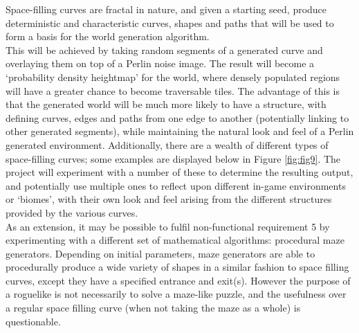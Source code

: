 \documentclass[12pt,a4paper]{article}
\begin{document}
Space-filling curves are fractal in nature, and given a starting seed, produce deterministic and characteristic curves, shapes and paths that will be used to form a basis for the world generation algorithm.\\

This will be achieved by taking random segments of a generated curve and overlaying them on top of a Perlin noise image. The result will become a `probability density heightmap' for the world, where densely populated regions will have a greater chance to become traversable tiles. The advantage of this is that the generated world will be much more likely to have a structure, with defining curves, edges and paths from one edge to another (potentially linking to other generated segments), while maintaining the natural look and feel of a Perlin generated environment. Additionally, there are a wealth of different types of space-filling curves; some examples are displayed below in Figure \ref{fig:fig9}. The project will experiment with a number of these to determine the resulting output, and potentially use multiple ones to reflect upon different in-game environments or `biomes', with their own look and feel arising from the different structures provided by the various curves. \\

As an extension, it may be possible to fulfil non-functional requirement 5 by experimenting with a different set of mathematical algorithms: procedural maze generators. Depending on initial parameters, maze generators are able to procedurally produce a wide variety of shapes in a similar fashion to space filling curves, except they have a specified entrance and exit(s). However the purpose of a roguelike is not necessarily to solve a maze-like puzzle, and the usefulness over a regular space filling curve (when not taking the maze as a whole) is questionable.
\end{document}
